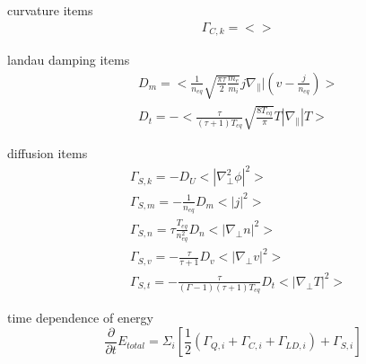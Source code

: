 \documentclass[11pt,a4paper]{article}
\begin{document}
curvature items
\begin{equation}
\begin{aligned}
&\Gamma_{C,k}=<>
\end{aligned}
\end{equation}

landau damping items
\begin{equation}
\begin{aligned}
&D_m=<\frac{1}{n_{eq}}\sqrt{\frac{\pi\tau}{2}\frac{m_e}{m_i}}j\nabla_\parallel|(v-\frac{j}{n_{eq}})> \\
&D_t=-<\frac{\tau}{(\tau+1)T_{eq}}\sqrt{\frac{8T_{eq}}{\pi}}T|\nabla_\parallel|T>
\end{aligned}
\end{equation}

diffusion items
\begin{equation}
\begin{aligned}
	&\Gamma_{S,k}=-D_U<|\nabla^2_\perp\phi|^2>	\\
	&\Gamma_{S,m}=-\frac{1}{n_{eq}}D_m<|j|^2>	\\
	&\Gamma_{S,n}=\tau\frac{T_{eq}}{n_{eq}^2}D_n<|\nabla_\perp{n}|^2>	\\
	&\Gamma_{S,v}=-\frac{\tau}{\tau+1}D_v<|\nabla_\perp{v}|^2>	\\
	&\Gamma_{S,t}=-\frac{\tau}{(\Gamma-1)(\tau+1)T_{eq}}D_t<|\nabla_\perp{T}|^2>
\end{aligned}
\end{equation}

time dependence of energy
\begin{equation}
\frac{\partial}{\partial{t}}E_{total}=\Sigma_i[ {\frac{1}{2}({\Gamma_{Q,i}}+{\Gamma_{C,i}}+{\Gamma_{LD,i}})} +\Gamma_{S,i}]
\end{equation}
\end{document}
